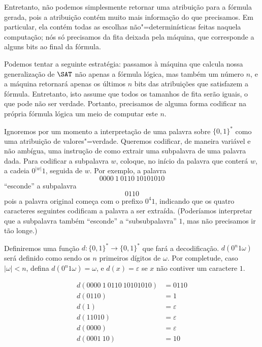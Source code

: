 Entretanto,
não podemos simplesmente retornar uma atribuição para a fórmula gerada,
pois a atribuição contém muito mais informação do que precisamos.
Em particular,
ela contém todas as escolhas não"=determinísticas feitas naquela computação;
nós só precisamos da fita deixada pela máquina,
que corresponde a alguns bits ao final da fórmula.

Podemos tentar a seguinte estratégia:
passamos à máquina que calcula nossa generalização de $\SAT$
não apenas a fórmula lógica,
mas também um número $n$,
e a máquina retornará apenas os últimos $n$
bits das atribuições que satisfazem a fórmula.
Entretanto, isto assume que todos os tamanhos de fita serão iguais,
o que pode não ser verdade.
Portanto, precisamos de alguma forma codificar na própria fórmula lógica
um meio de computar este $n$.

Ignoremos por um momento a interpretação de uma palavra sobre $\{0, 1\}^*$
como uma atribuição de valores"=verdade.
Queremos codificar, de maneira variável e não ambígua,
uma instrução de como extrair uma subpalavra de uma palavra dada.
Para codificar a subpalavra $w$,
coloque, no início da palavra que conterá $w$,
a cadeia $0^{|w|}1$, seguida de $w$.
Por exemplo,
a palavra
\begin{equation*}
    0000\ 1\ 0110\ 10101010
\end{equation*}
``esconde'' a subpalavra
\begin{equation*}
    0110
\end{equation*}
pois a palavra original começa com o prefixo $0^4 1$,
indicando que os quatro caracteres seguintes codificam a palavra a ser extraída.
(Poderíamos interpretar que a subpalavra também ``esconde''
a ``subsubpalavra'' $1$, mas não precisamos ir tão longe.)

Definiremos uma função $d: \{0, 1\}^* \to \{0, 1\}^*$ que fará a decodificação.
$d(0^n1\omega)$ será definido como sendo os $n$ primeiros dígitos de $\omega$.
Por completude, caso $|\omega| < n$, defina $d(0^n1\omega) = \omega$,
e $d(x) = \varepsilon$ se $x$ não contiver um caractere $1$.
\begin{example}
    \begin{align*}
        d(0000\ 1\ 0110\ 10101010) &= 0110 \\
        d(0110) &= 1 \\
        d(1) &= \varepsilon \\
        d(11010) &= \varepsilon \\
        d(0000) &= \varepsilon \\
        d(0001\ 10) &= 10
    \end{align*}
\end{example}

